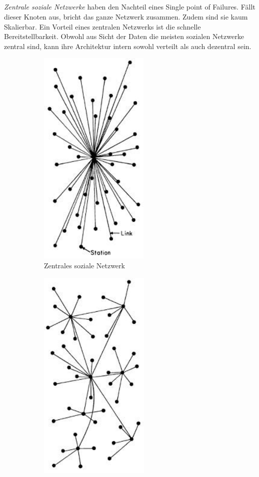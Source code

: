 	\subsection{
	}
	\label{sub:difference}
	\textit{Zentrale soziale Netzwerke} haben den Nachteil eines \glqq Single point of Failures\grqq. Fällt dieser Knoten aus, bricht das ganze Netzwerk zusammen. Zudem sind sie kaum Skalierbar. Ein Vorteil eines zentralen Netzwerks ist die schnelle Bereitstellbarkeit. Obwohl aus Sicht der Daten die meisten sozialen Netzwerke zentral sind, kann ihre Architektur intern sowohl verteilt als auch dezentral sein.\\
	
	\begin{figure}[!t] 
		\centering
		\begin{subfigure}[t]{0.4\linewidth}
			\centering
			\includegraphics[width=0.4\linewidth]{figures/centralized-network.png}
			\caption{Zentrales soziale Netzwerk}
			\label{fig:central-network}
		\end{subfigure}
		\begin{subfigure}[t]{0.4\linewidth}
			\centering
			\includegraphics[width=0.4\linewidth]{figures/decentralized-network.png}

\end{subfigure}
\end{figure}
